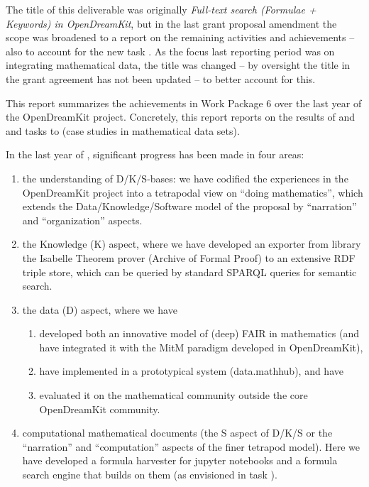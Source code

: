 The title of this deliverable was originally \emph{Full-text search (Formulae + Keywords) in OpenDreamKit}, but in the last grant proposal amendment the scope was broadened to a report on the remaining  activities and achievements -- also to account for the new task . As the focus last reporting period was on integrating mathematical data, the title was changed -- by oversight the title in the grant agreement has not been updated -- to better account for this.

This report summarizes the achievements in Work Package 6 over the last year of the OpenDreamKit project. Concretely, this report reports on the results of  and  and tasks  to  (case studies in mathematical data sets).

In the last year of \pn, significant progress has been made in four areas:
\begin{enumerate}
\item the understanding of D/K/S-bases: we have codified the experiences in the OpenDreamKit project into a tetrapodal view on ``doing mathematics'', which extends the Data/Knowledge/Software model of the proposal by ``narration'' and ``organization'' aspects.
\item the Knowledge (K) aspect, where we have developed an exporter from library the Isabelle Theorem prover (Archive of Formal Proof) to an extensive RDF triple store, which can be queried by standard SPARQL queries for semantic search. \item the data (D) aspect, where we have
  \begin{enumerate}
  \item developed both an innovative model of (deep) FAIR in mathematics (and have integrated it with the MitM paradigm developed in OpenDreamKit),
  \item have implemented in a prototypical system (data.mathhub), and have
  \item evaluated it on the mathematical community outside the core OpenDreamKit community.
  \end{enumerate}
\item computational mathematical documents (the S aspect of D/K/S or the ``narration'' and ``computation'' aspects of the finer tetrapod model). Here we have developed a formula harvester for jupyter notebooks and a formula search engine that builds on them (as envisioned in task ).
\end{enumerate}

